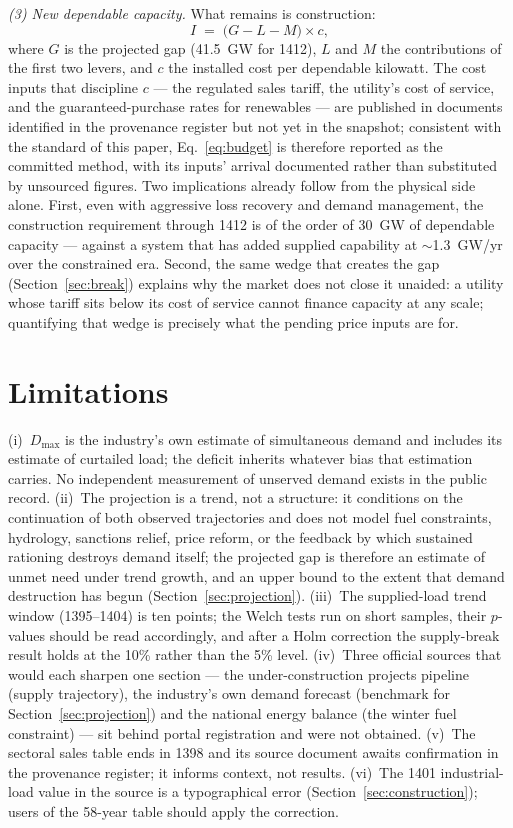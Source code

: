 \documentclass[conference]{IEEEtran}
\begin{document}
\emph{(3) New dependable capacity.} What remains is construction:
\begin{equation}
I \;=\; \bigl(G - L - M\bigr) \times c,
\label{eq:budget}
\end{equation}
where $G$ is the projected gap (41.5~GW for 1412), $L$ and $M$ the contributions of the first two levers, and $c$ the installed cost per dependable kilowatt. The cost inputs that discipline $c$ --- the regulated sales tariff, the utility's cost of service, and the guaranteed-purchase rates for renewables --- are published in documents identified in the provenance register but not yet in the snapshot; consistent with the standard of this paper, Eq.~\eqref{eq:budget} is therefore reported as the committed method, with its inputs' arrival documented rather than substituted by unsourced figures. Two implications already follow from the physical side alone. First, even with aggressive loss recovery and demand management, the construction requirement through 1412 is of the order of 30~GW of dependable capacity --- against a system that has added supplied capability at $\sim$1.3~GW/yr over the constrained era. Second, the same wedge that creates the gap (Section~\ref{sec:break}) explains why the market does not close it unaided: a utility whose tariff sits below its cost of service cannot finance capacity at any scale; quantifying that wedge is precisely what the pending price inputs are for.

\section{Limitations}
\label{sec:limits}
(i)~$D_{\max}$ is the industry's own estimate of simultaneous demand and includes its estimate of curtailed load; the deficit inherits whatever bias that estimation carries. No independent measurement of unserved demand exists in the public record. (ii)~The projection is a trend, not a structure: it conditions on the continuation of both observed trajectories and does not model fuel constraints, hydrology, sanctions relief, price reform, or the feedback by which sustained rationing destroys demand itself; the projected gap is therefore an estimate of unmet need under trend growth, and an upper bound to the extent that demand destruction has begun (Section~\ref{sec:projection}). (iii)~The supplied-load trend window (1395--1404) is ten points; the Welch tests run on short samples, their $p$-values should be read accordingly, and after a Holm correction the supply-break result holds at the 10\% rather than the 5\% level. (iv)~Three official sources that would each sharpen one section --- the under-construction projects pipeline (supply trajectory), the industry's own demand forecast (benchmark for Section~\ref{sec:projection}) and the national energy balance (the winter fuel constraint) --- sit behind portal registration and were not obtained. (v)~The sectoral sales table ends in 1398 and its source document awaits confirmation in the provenance register; it informs context, not results. (vi)~The 1401 industrial-load value in the source is a typographical error (Section~\ref{sec:construction}); users of the 58-year table should apply the correction.
\end{document}
